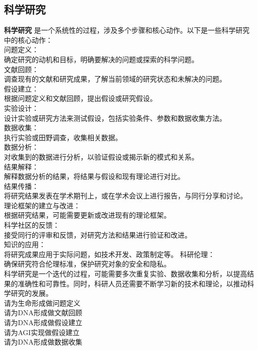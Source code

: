 \documentclass[12pt]{book}
\begin{document}
\subsection{科学研究}
\textbf{科学研究}
是一个系统性的过程，涉及多个步骤和核心动作。以下是一些科学研究中的核心动作：\\
问题定义：\\
确定研究的动机和目标，明确要解决的问题或探索的科学问题。\\
文献回顾：\\
调查现有的文献和研究成果，了解当前领域的研究状态和未解决的问题。\\
假设建立：\\
根据问题定义和文献回顾，提出假设或研究假设。\\
实验设计：\\
设计实验或研究方法来测试假设，包括实验条件、参数和数据收集方法。\\
数据收集：\\
执行实验或田野调查，收集相关数据。\\
数据分析：\\
对收集到的数据进行分析，以验证假设或揭示新的模式和关系。\\
结果解释：\\
解释数据分析的结果，将结果与假设和现有理论进行对比。\\
结果传播：\\
将研究结果发表在学术期刊上，或在学术会议上进行报告，与同行分享和讨论。\\
理论框架的建立与改进：\\
根据研究结果，可能需要更新或改进现有的理论框架。\\
科学社区的反馈：\\
接受同行的评审和反馈，对研究方法和结果进行验证和改进。\\
知识的应用：\\
将研究成果应用于实际问题，如技术开发、政策制定等。
科研伦理：\\
确保研究符合伦理标准，保护研究对象的安全和隐私。\\
科学研究是一个迭代的过程，可能需要多次重复实验、数据收集和分析，以提高结果的准确性和可靠性。同时，科研人员还需要不断学习新的技术和理论，以推动科学研究的发展。\\



请为生命形成做问题定义\\
请为DNA形成做文献回顾\\
请为DNA形成做假设建立\\
请为AGI实现做假设建立\\
请为DNA形成做数据收集\\
\end{document}
